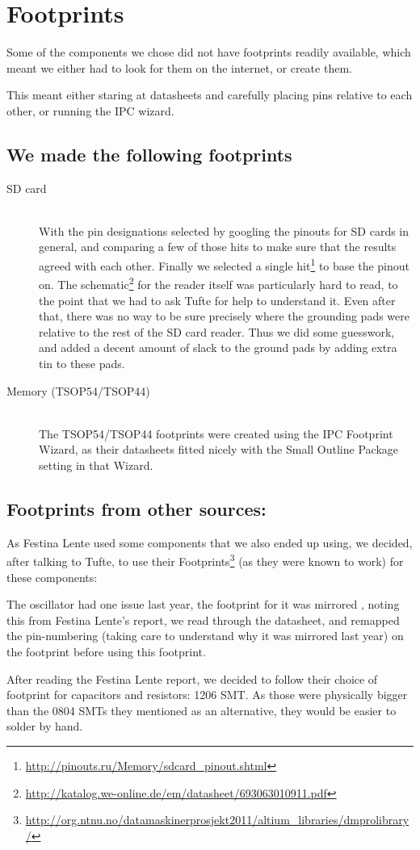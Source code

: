 \section {Footprints}
Some of the components we chose did not have footprints readily available, which
meant we either had to look for them on the internet, or create them.

This meant either staring at datasheets and carefully placing pins
relative to each other, or running the IPC wizard.

\subsection{We made the following footprints}

\begin{description}
\item[SD card] \hfill
\\
  With the pin designations selected by googling the pinouts for
  \ac{SD} cards in general, and comparing a few of those hits to make sure that
  the results agreed with each other. Finally we selected a single hit\footnote{\url{http://pinouts.ru/Memory/sdcard_pinout.shtml}}
  to base the pinout on. The
  schematic\footnote{\url{http://katalog.we-online.de/em/datasheet/693063010911.pdf}}
  for the reader itself was particularly hard to read, to the point that we had to ask Tufte
  for help to understand it. Even after that, there was no way to be sure
  precisely where the grounding pads were relative to the rest of the \ac{SD}
  card reader. Thus we did some guesswork, and added a decent amount
  of slack to the ground pads by adding extra tin to these pads.
\item[Memory (TSOP54/TSOP44)] \hfill
\\
  The TSOP54/TSOP44 footprints were created using
  the IPC Footprint Wizard, as their datasheets fitted nicely with the Small
  Outline Package setting in that Wizard.
\end{description}

\subsection{Footprints from other sources:}
As Festina Lente used some components that we also ended up using, we decided,
after talking to Tufte, to use their Footprints\footnote{\url{http://org.ntnu.no/datamaskinerprosjekt2011/altium_libraries/dmprolibrary/}}
(as they were known to work) for these components:


The oscillator had one issue last year, the footprint for it was mirrored
, noting this from Festina Lente's report, we read
through the datasheet, and remapped the pin-numbering (taking care to understand
why it was mirrored last year) on the footprint 
before using this footprint.

After reading the Festina Lente report\cite{berg2011festinalente}, we decided to
follow their choice of footprint for capacitors and resistors: 1206 SMT. As
those were physically bigger than the 0804 SMTs they mentioned as an
alternative, they would be easier to solder by hand.
